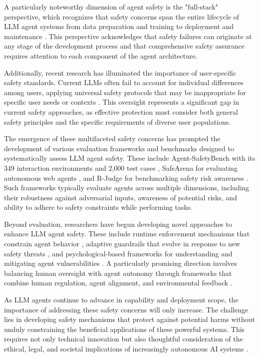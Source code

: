 \documentclass[conference]{IEEEtran}
\begin{document}
A particularly noteworthy dimension of agent safety is the "full-stack" perspective, which recognizes that safety concerns span the entire lifecycle of LLM agent systems from data preparation and training to deployment and maintenance \cite{2504.15585}. This perspective acknowledges that safety failures can originate at any stage of the development process and that comprehensive safety assurance requires attention to each component of the agent architecture.

Additionally, recent research has illuminated the importance of user-specific safety standards. Current LLMs often fail to account for individual differences among users, applying universal safety protocols that may be inappropriate for specific user needs or contexts \cite{2502.15086}. This oversight represents a significant gap in current safety approaches, as effective protection must consider both general safety principles and the specific requirements of diverse user populations.

The emergence of these multifaceted safety concerns has prompted the development of various evaluation frameworks and benchmarks designed to systematically assess LLM agent safety. These include Agent-SafetyBench with its 349 interaction environments and 2,000 test cases \cite{2412.14470}, SafeArena for evaluating autonomous web agents \cite{2503.04957}, and R-Judge for benchmarking safety risk awareness \cite{2401.10019}. Such frameworks typically evaluate agents across multiple dimensions, including their robustness against adversarial inputs, awareness of potential risks, and ability to adhere to safety constraints while performing tasks.

Beyond evaluation, researchers have begun developing novel approaches to enhance LLM agent safety. These include runtime enforcement mechanisms that constrain agent behavior \cite{2503.18666}, adaptive guardrails that evolve in response to new safety threats \cite{2502.11448}, and psychological-based frameworks for understanding and mitigating agent vulnerabilities \cite{2401.11880}. A particularly promising direction involves balancing human oversight with agent autonomy through frameworks that combine human regulation, agent alignment, and environmental feedback \cite{2402.04247}.

As LLM agents continue to advance in capability and deployment scope, the importance of addressing these safety concerns will only increase. The challenge lies in developing safety mechanisms that protect against potential harms without unduly constraining the beneficial applications of these powerful systems. This requires not only technical innovation but also thoughtful consideration of the ethical, legal, and societal implications of increasingly autonomous AI systems \cite{2501.17315}.
\end{document}
